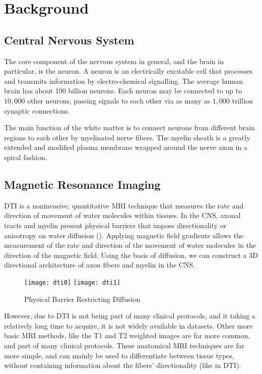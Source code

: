 \section{Background}

\subsection{Central Nervous System}

The core component of the nervous system in general, and the brain in particular, is the neuron. A neuron is an electrically excitable cell that processes and transmits information by electro-chemical signalling. The average human brain has about 100 billion neurons. Each neuron may be connected to up to $10,000$ other neurons, passing signals to each other via as many as $1,000$ trillion synaptic connections. \cite{brain}\par
The main function of the white matter is to connect neurons from different brain regions to each other by myelinated nerve fibers. \cite{white} The myelin sheath is a greatly extended and modified plasma membrane wrapped around the nerve axon in a spiral fashion. \cite{myelin}\par

\subsection{Magnetic Resonance Imaging}

\ac{DTI} is a noninvasive, quantitative \ac{MRI} technique that measures the rate and direction of movement of water molecules within tissues. In the \ac{CNS}, axonal tracts and myelin present physical barriers that impose directionality or anisotropy on water diffusion (). Applying magnetic field gradients allows the measurement of the rate and direction of the movement of water molecules in the direction of the magnetic field. Using the basis of diffusion, we can construct a 3D directional architecture of axon fibers and myelin in the \ac{CNS}. \cite{dti}
\begin{figure}[H]
\centering
\texttt{[image: dti0]}
\texttt{[image: dti1]}
\caption{Physical Barrier Restricting Diffusion}
\label{fig:dti}
\end{figure}
However, due to \ac{DTI} is not being part of many clinical protocols, and it taking a relatively long time to acquire, it is not widely available in datasets. Other more basic \ac{MRI} methods, like the T1 and T2 weighted images are far more common, and part of many clinical protocols. These anatomical \ac{MRI} techniques are far more simple, and can mainly be used to differentiate between tissue types, without containing information about the fibers' directionality (like in \ac{DTI}).


